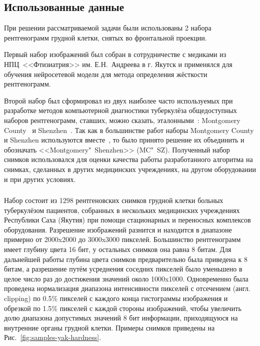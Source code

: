 \subsection{Использованные данные}

При решении рассматриваемой задачи были использованы 2 набора рентгенограмм грудной клетки, снятых во фронтальной проекции.

Первый набор изображений был собран в сотрудничестве с медиками из НПЦ~<<Фтизиатрия>> им. Е.Н.~Андреева в г. Якутск и применялся для обучения нейросетевой модели для метода определения жёсткости рентгенограмм.

Второй набор был сформировал из двух наиболее часто используемых при разработке методов компьютерной диагностики туберкулёза общедоступных наборов рентгенограмм, ставших, можно сказать, эталонными~\cite{oloko2022systematic, zeyu2022review, singh2022evolution, santosh2022advances}: Montgomery County~\cite{candemir2013lung} и Shenzhen~\cite{jaeger2013automatic}. Так как в большинстве работ наборы Montgomery County и Shenzhen используются вместе~\cite{oloko2022systematic, zeyu2022review}, то было принято решение их объединить и обозначать <<Montgomery"~Shenzhen>> (MC"~SZ). Полученный набор снимков использовался для оценки качества работы разработанного алгоритма на снимках, сделанных в других медицинских учреждениях, на другом оборудовании и при других условиях.

\subsubsection{} \label{subsubsec:dataset-yak-hardness}

Набор состоит из 1298 рентгеновских снимков грудной клетки больных туберкулёзом пациентов, собранных в нескольких медицинских учреждениях Республики Саха (Якутия) при помощи стационарных и переносных комплексов оборудования. Разрешение изображений разнится  и находится в диапазоне примерно от 2000x2000 до 3000x3000 пикселей. Большинство рентгенограмм имеет глубину цвета 16 бит, у остальных снимков она равна 8 битам.
Для дальнейшей работы глубина цвета снимков предварительно была приведена к 8 битам, а разрешение путём усреднения соседних пикселей было уменьшено в целое число раз до достижения значений около 1000x1000. Одновременно была проведена нормализация диапазона интенсивности пикселей с отсечением (англ. clipping) по 0.5\% пикселей с каждого конца гистограммы изображения и обрезкой по 1.5\% пикселей с каждой стороны изображений, чтобы увеличить долю диапазона допустимых значений 8 бит информации, приходящуюся на внутренние органы грудной клетки. Примеры снимков приведены на Рис.~\ref{fig:samples-yak-hardness}.

